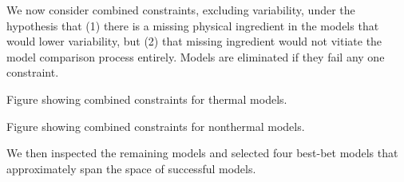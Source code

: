 We now consider combined constraints, excluding variability, under the hypothesis that (1) there is a missing physical ingredient in the models that would lower variability, but (2) that missing ingredient would not vitiate the model comparison process entirely.  Models are eliminated if they fail any one constraint.

Figure showing combined constraints for thermal models.

Figure showing combined constraints for nonthermal models.

We then inspected the remaining models and selected four best-bet models that approximately span the space of successful models.  

